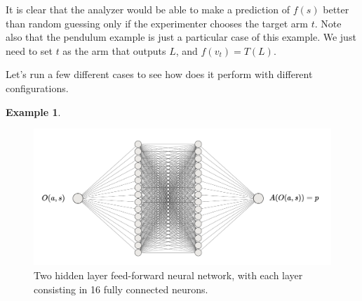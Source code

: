 \documentclass[11pt,a4paper,twoside]{report}
\newcommand{\+}{\textnormal{+} }
\theoremstyle{definition}
\newtheorem{myex}[mythm]{Example}
\numberwithin{equation}{chapter}
\begin{document}
  \par It is clear that the analyzer would be able to make a prediction of
  $f(s)$ better than random guessing only if the experimenter chooses the target
  arm $t$. Note also that the pendulum example is just a particular case of this
  example. We just need to set $t$ as the arm that outputs $L$, and
  $f(v_t)=T(L)$.

  Let's run a few different cases to see how does it perform with different
  configurations.

  \begin{myex}\label{MAB1ex}

    \begin{figure}
      \centering
      \includegraphics[scale=0.5]{figures/analyzer1.pdf}
      \caption{Two hidden layer feed-forward neural network, with each layer
      consisting in 16 fully connected neurons.}
      \label{analyzer1}
    \end{figure}



\end{myex}
\end{document}

